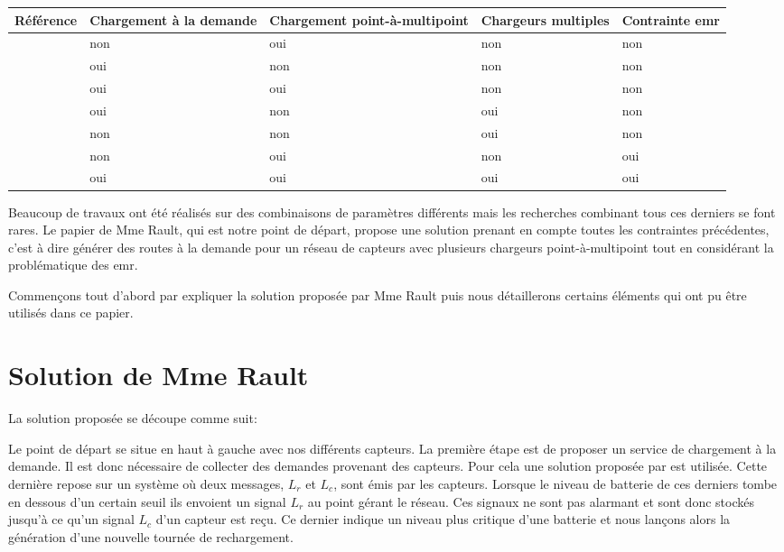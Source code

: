 \documentclass[noposter,final]{polytech/polytech}
\begin{document}
	\begin{center}
		\centering
		\begin{tabularx}{\textwidth}{|c||X|X|X|X|}
			\hline
			Référence & Chargement à la demande & Chargement point-à-multipoint & Chargeurs multiples & Contrainte \gls{emr}\\\hline\hline
			\cite{6275766} \cite{LIN2016381} & non & oui & non & non\\\hline
			\cite{6911792} \cite{1999253} & oui & non & non & non\\\hline
			\cite{KHELLADI201744} & oui & oui & non & non\\\hline
			\cite{LIN201688} \cite{Madhja2015} \cite{wang2013multi} \cite{Jiang2014} & oui & non & oui & non\\\hline
			\cite{7889006} & non & non & oui & non\\\hline
			\cite{NIKOLETSEAS20171} \cite{8051273} \cite{6888920} \cite{7524385} & non & oui & non & oui\\\hline\hline
			\rowcolor{polytechlightblue}
			\cite{Rault:chargers} & oui & oui & oui & oui\\\hline
		\end{tabularx}	
	\end{center}
	
	Beaucoup de travaux ont été réalisés sur des combinaisons de paramètres différents mais les recherches combinant tous ces derniers se font rares.
	Le papier de Mme Rault, qui est notre point de départ, propose une solution prenant en compte toutes les contraintes précédentes, c'est à dire générer des routes à la demande pour un réseau de capteurs avec plusieurs chargeurs point-à-multipoint tout en considérant la problématique des \gls{emr}.
	
	Commençons tout d'abord par expliquer la solution proposée par Mme Rault puis nous détaillerons certains éléments qui ont pu être utilisés dans ce papier.
			
	\section{Solution de Mme Rault}
		La solution proposée se découpe comme suit:
	
	
		Le point de départ se situe en haut à gauche avec nos différents capteurs.
		La première étape est de proposer un service de chargement à la demande.
		Il est donc nécessaire de collecter des demandes provenant des capteurs.
		Pour cela une solution proposée par \cite{KHELLADI201744} est utilisée.
		Cette dernière repose sur un système où deux messages, $L_r$ et $L_c$, sont émis par les capteurs.
		Lorsque le niveau de batterie de ces derniers tombe en dessous d'un certain seuil ils envoient un signal $L_r$ au point gérant le réseau.
		Ces signaux ne sont pas alarmant et sont donc stockés jusqu'à ce qu'un signal $L_c$ d'un capteur est reçu.
		Ce dernier indique un niveau plus critique d'une batterie et nous lançons alors la génération d'une nouvelle tournée de rechargement.
	
\end{document}
